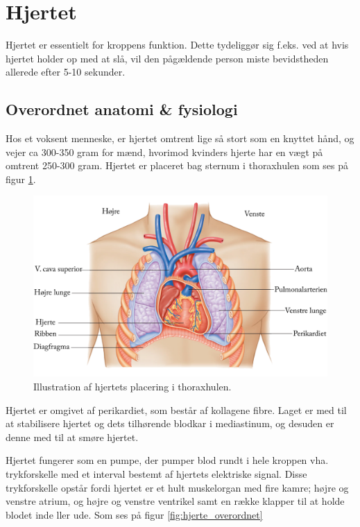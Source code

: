 \section{Hjertet}\label{Hjerte}


Hjertet er essentielt for kroppens funktion. Dette tydeliggør sig f.eks. ved at hvis hjertet holder op med at slå, vil den pågældende person miste bevidstheden allerede efter 5-10 sekunder. 

\subsection{Overordnet anatomi \& fysiologi}\label{Hjerte_ana_fys}

Hos et voksent menneske, er hjertet omtrent lige så stort som en knyttet hånd, og vejer ca 300-350 gram for mænd, hvorimod kvinders hjerte har en vægt på omtrent 250-300 gram. Hjertet er placeret bag sternum i thoraxhulen som ses på figur \ref{fig:hjerte_placering}. %

\begin{figure}[H] %
\begin{center}
\includegraphics[width=1\textwidth]{figures/thorax}
\end{center}
\caption{Illustration af hjertets placering i thoraxhulen. \cite{cindy}}
\label{fig:hjerte_placering}
\end{figure}

Hjertet er omgivet af perikardiet, som består af kollagene fibre. Laget er med til at stabilisere hjertet og dets tilhørende blodkar i mediastinum, og desuden er denne med til at smøre hjertet.


Hjertet fungerer som en pumpe, der pumper blod rundt i hele kroppen vha. trykforskelle med et interval bestemt af hjertets elektriske signal. Disse trykforskelle opstår fordi hjertet er et hult muskelorgan med fire kamre; højre og venstre atrium, og højre og venstre ventrikel samt en række klapper til at holde blodet inde ller ude. Som ses på figur \ref{fig:hjerte_overordnet}

